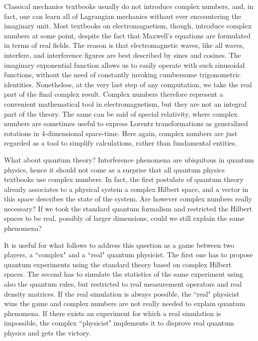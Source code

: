 \documentclass[onecolumn,prx,amsmath,amssymb,12pt]{revtex4-2}
\begin{document}
Classical mechanics textbooks usually do not introduce complex numbers, and, in fact, one can learn all of Lagrangian mechanics without ever encountering the imaginary unit. Most textbooks on electromagnetism, though, introduce complex numbers at some point, despite the fact that Maxwell's equations are formulated in terms of real fields. The reason is that electromagnetic waves, like all waves, interfere, and interference figures are best described by sines and cosines. The imaginary exponential function allows us to easily operate with such sinusoidal functions, without the need of constantly invoking cumbersome trigonometric identities. Nonetheless, at the very last step of any computation, we take the real part of the final complex result. Complex numbers therefore represent a convenient mathematical tool in electromagnetism, but they are not an integral part of the theory.
The same can be said of special relativity, where complex numbers are sometimes useful to express Lorentz transformations as generalized rotations in 4-dimensional space-time. Here again, complex numbers are just regarded as a tool to simplify calculations, rather than fundamental entities.

What about quantum theory? Interference phenomena are ubiquitous in quantum physics, hence it should not come as a surprise that all quantum physics textbooks use complex numbers. In fact, the first postulate of quantum theory already associates to a physical system a complex Hilbert space, and a vector in this space describes the state of the system. Are however complex numbers really necessary? If we took the standard quantum formalism and restricted the Hilbert spaces to be real, possibly of larger dimensions, could we still explain the same phenomena?


It is useful for what follows to address this question as a game between two players, a ``complex" and a ``real" quantum physicist. The first one has to propose quantum experiments using the standard theory based on complex Hilbert spaces. The second has to simulate the statistics of the same experiment using also the quantum rules, but restricted to real measurement operators and real density matrices. If the real simulation is always possible, the ``real" physicist wins the game and complex numbers are not really needed to explain quantum phenomena. If there exists an experiment for which a real simulation is impossible, the complex ``physicist" implements it to disprove real quantum physics and gets the victory.
\end{document}
